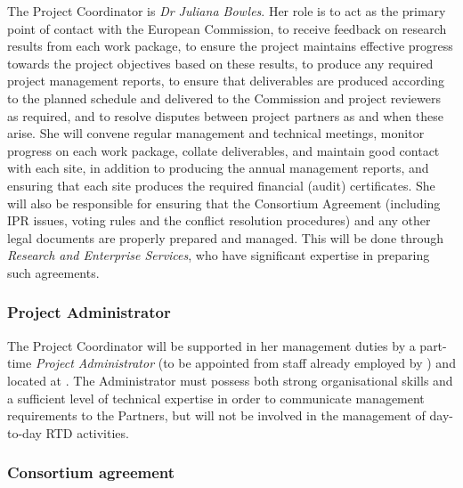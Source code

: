 \documentclass[a4paper,11pt]{article}
\begin{document}
The Project Coordinator is \emph{Dr Juliana Bowles}.  Her role
is to act as the primary point of contact with the European
Commission, to receive feedback on research results from each
work package, to ensure the project maintains effective
progress towards the project objectives based on these results,
to produce any required  project management reports, to ensure
that deliverables are produced according to the planned
schedule and delivered to the Commission and project reviewers
as required, and to resolve disputes between project partners
as and when these arise.  She will convene regular management
and technical meetings, monitor progress on each work package,
collate deliverables, and maintain good contact with each site,
in addition to producing the annual management reports, and
ensuring that each site produces the required financial (audit)
certificates.  She will also be responsible for ensuring that
the Consortium Agreement (including IPR issues, voting rules and the conflict resolution procedures)
and any other legal documents are properly prepared and managed. This will be
done through \SAshort{} \emph{Research and Enterprise
Services}, who have significant expertise in preparing such
agreements.

\vspace{12pt}
\subsubsection*{Project Administrator}
\vspace{-6pt}

The Project Coordinator will be supported in her management
duties by a part-time \emph{Project Administrator} (to be appointed
from staff already employed by \SA{}) and located at \SA{}.  The Administrator
must possess both strong organisational skills and a
sufficient level of technical expertise in order to communicate
management requirements to the Partners, but will not be
involved in the management of day-to-day RTD activities.

\vspace{12pt}
\subsubsection*{Consortium agreement}
\vspace{-6pt}

\end{document}
